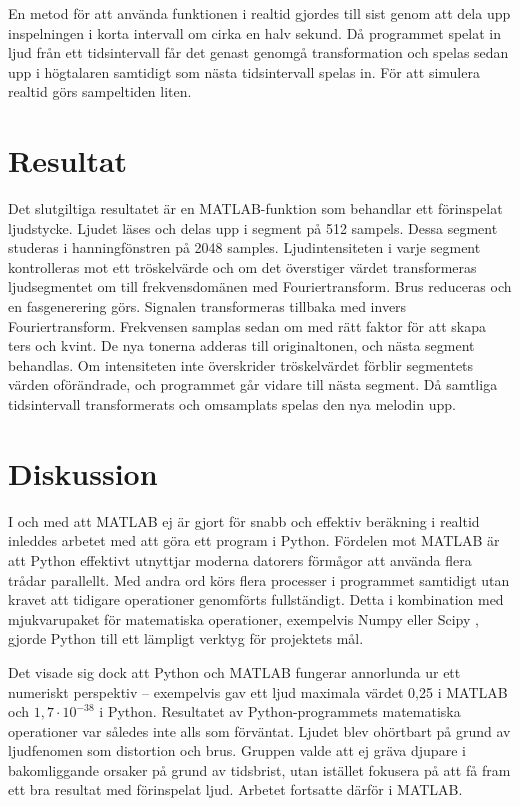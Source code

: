 \documentclass[12pt,a4paper]{article}
\begin{document}
En metod för att använda funktionen i realtid gjordes till sist genom att dela upp inspelningen i korta intervall om cirka en halv sekund. Då programmet spelat in ljud från ett tidsintervall får det genast genomgå transformation och spelas sedan upp i högtalaren samtidigt som nästa tidsintervall spelas in. För att simulera realtid görs sampeltiden liten.

\section{Resultat}

Det slutgiltiga resultatet är en MATLAB-funktion som behandlar ett förinspelat ljudstycke. Ljudet läses och delas upp i segment på 512 sampels. Dessa segment studeras i hanningfönstren på 2048 samples. Ljudintensiteten i varje segment kontrolleras mot ett tröskelvärde och om det överstiger värdet transformeras ljudsegmentet om till frekvensdomänen med Fouriertransform. Brus reduceras och en fasgenerering görs. Signalen transformeras tillbaka med invers Fouriertransform. Frekvensen samplas sedan om med rätt faktor för att skapa ters och kvint. De nya tonerna adderas till originaltonen, och nästa segment behandlas. Om intensiteten inte överskrider tröskelvärdet förblir segmentets värden oförändrade, och programmet går vidare till nästa segment. Då samtliga tidsintervall transformerats och omsamplats spelas den nya melodin upp.

\section{Diskussion}

I och med att MATLAB ej är gjort för snabb och effektiv beräkning i realtid inleddes arbetet med att göra ett program i Python. Fördelen mot MATLAB är att Python effektivt utnyttjar moderna datorers förmågor att använda flera trådar parallellt. Med andra ord körs flera processer i programmet samtidigt utan kravet att tidigare operationer genomförts fullständigt. Detta i kombination med mjukvarupaket för matematiska operationer, exempelvis Numpy eller Scipy \cite{bib:scipy}, gjorde Python till ett lämpligt verktyg för projektets mål.

Det visade sig dock att Python och MATLAB fungerar annorlunda ur ett numeriskt perspektiv – exempelvis gav ett ljud maximala värdet 0,25 i MATLAB och $1,7 \cdot 10^{-38}$ i Python. Resultatet av Python-programmets matematiska operationer var således inte alls som förväntat. Ljudet blev ohörtbart på grund av ljudfenomen som distortion och brus. Gruppen valde att ej gräva djupare i bakomliggande orsaker på grund av tidsbrist, utan istället fokusera på att få fram ett bra resultat med förinspelat ljud. Arbetet fortsatte därför i MATLAB.
\end{document}
